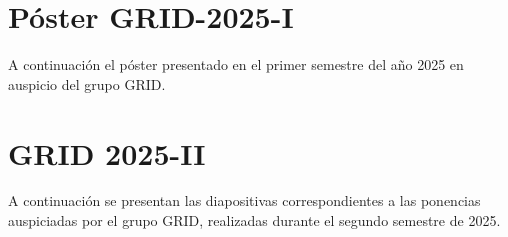 
\section{Póster GRID-2025-I}\label{sec:poster}

A continuación el póster presentado en el primer semestre del año 2025 en auspicio del grupo GRID.

\newpage

\section{GRID 2025-II}\label{sec:grid-2025-ii}

A continuación se presentan las diapositivas correspondientes a las ponencias auspiciadas por el grupo GRID, realizadas durante el segundo semestre de 2025.

